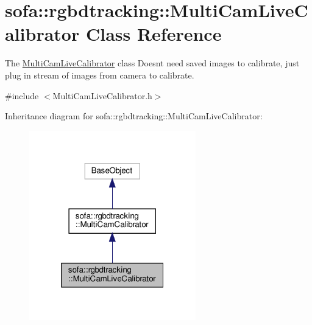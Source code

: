 \hypertarget{classsofa_1_1rgbdtracking_1_1_multi_cam_live_calibrator}{}\section{sofa\+:\+:rgbdtracking\+:\+:Multi\+Cam\+Live\+Calibrator Class Reference}
\label{classsofa_1_1rgbdtracking_1_1_multi_cam_live_calibrator}


The \hyperlink{classsofa_1_1rgbdtracking_1_1_multi_cam_live_calibrator}{Multi\+Cam\+Live\+Calibrator} class Doesn\textquotesingle{}t need saved images to calibrate, just plug in stream of images from camera to calibrate.  




{\ttfamily \#include $<$Multi\+Cam\+Live\+Calibrator.\+h$>$}



Inheritance diagram for sofa\+:\+:rgbdtracking\+:\+:Multi\+Cam\+Live\+Calibrator\+:
\nopagebreak
\begin{figure}[H]
\begin{center}
\leavevmode
\includegraphics[width=205pt]{classsofa_1_1rgbdtracking_1_1_multi_cam_live_calibrator__inherit__graph}
\end{center}
\end{figure}


